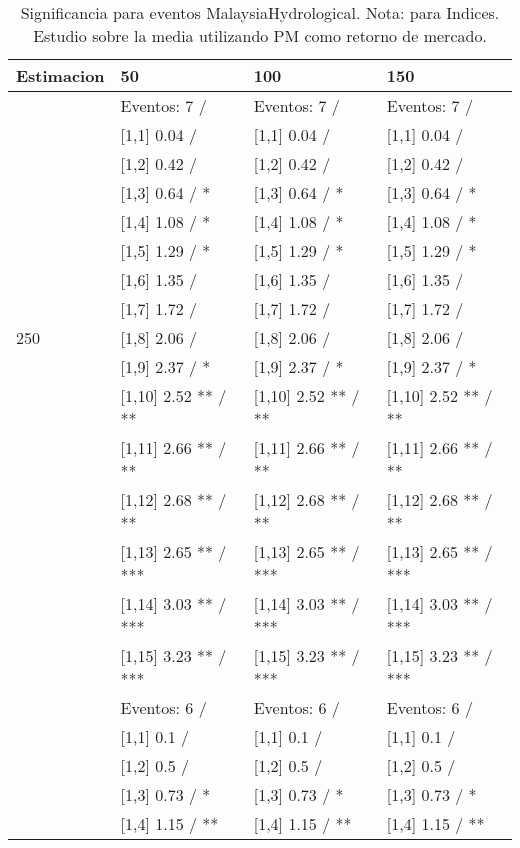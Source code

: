 \begin{table}

\caption{Significancia para eventos MalaysiaHydrological. Nota: para Indices. Estudio sobre la media utilizando PM como retorno de mercado.}
\centering
\begin{tabular}[t]{llll}
\toprule
Estimacion & 50 & 100 & 150\\
\midrule
 & Eventos:  7 / & Eventos:  7 / & Eventos:  7 /\\
 & {}[1,1] 0.04  / & {}[1,1] 0.04  / & {}[1,1] 0.04  /\\
 & {}[1,2] 0.42  / & {}[1,2] 0.42  / & {}[1,2] 0.42  /\\
 & {}[1,3] 0.64  / * & {}[1,3] 0.64  / * & {}[1,3] 0.64  / *\\
 & {}[1,4] 1.08  / * & {}[1,4] 1.08  / * & {}[1,4] 1.08  / *\\
\addlinespace
 & {}[1,5] 1.29  / * & {}[1,5] 1.29  / * & {}[1,5] 1.29  / *\\
 & {}[1,6] 1.35  / & {}[1,6] 1.35  / & {}[1,6] 1.35  /\\
 & {}[1,7] 1.72  / & {}[1,7] 1.72  / & {}[1,7] 1.72  /\\
250 & {}[1,8] 2.06  / & {}[1,8] 2.06  / & {}[1,8] 2.06  /\\
 & {}[1,9] 2.37  / * & {}[1,9] 2.37  / * & {}[1,9] 2.37  / *\\
\addlinespace
 & {}[1,10] 2.52 ** / ** & {}[1,10] 2.52 ** / ** & {}[1,10] 2.52 ** / **\\
 & {}[1,11] 2.66 ** / ** & {}[1,11] 2.66 ** / ** & {}[1,11] 2.66 ** / **\\
 & {}[1,12] 2.68 ** / ** & {}[1,12] 2.68 ** / ** & {}[1,12] 2.68 ** / **\\
 & {}[1,13] 2.65 ** / *** & {}[1,13] 2.65 ** / *** & {}[1,13] 2.65 ** / ***\\
 & {}[1,14] 3.03 ** / *** & {}[1,14] 3.03 ** / *** & {}[1,14] 3.03 ** / ***\\
\addlinespace
 & {}[1,15] 3.23 ** / *** & {}[1,15] 3.23 ** / *** & {}[1,15] 3.23 ** / ***\\
 & Eventos:  6 / & Eventos:  6 / & Eventos:  6 /\\
 & {}[1,1] 0.1  / & {}[1,1] 0.1  / & {}[1,1] 0.1  /\\
 & {}[1,2] 0.5  / & {}[1,2] 0.5  / & {}[1,2] 0.5  /\\
 & {}[1,3] 0.73  / * & {}[1,3] 0.73  / * & {}[1,3] 0.73  / *\\
\addlinespace
 & {}[1,4] 1.15  / ** & {}[1,4] 1.15  / ** & {}[1,4] 1.15  / **\\

\end{tabular}
\end{table}
